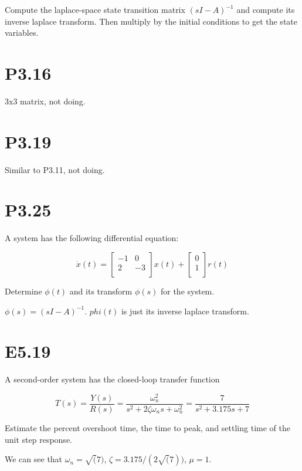 \documentclass[11pt]{article}
\begin{document}
Compute the laplace-space state transition matrix $(sI - A)^{-1}$ and compute its inverse laplace transform. Then multiply by the initial conditions to get the state variables.

\section{P3.16}

3x3 matrix, not doing.

\section{P3.19}

Similar to P3.11, not doing.

\section{P3.25}

A system has the following differential equation:

\[ 
    \dot x(t) =
    \begin{bmatrix}
        -1 & 0 \\
        2 & -3 \\
    \end{bmatrix}
    x(t) + 
    \begin{bmatrix}
        0 \\
        1 \\
    \end{bmatrix}
    r(t)
\]

Determine $\phi(t)$ and its transform $\phi(s)$ for the system.

$\phi(s) = (sI - A)^{-1}$. $phi(t)$ is just its inverse laplace transform.

\section{E5.19}

A second-order system has the closed-loop transfer function

\[
    T(s) = \dfrac{Y(s)}{R(s)} = \dfrac{\omega^2_n}{s^2 + 2 \zeta \omega_n s + \omega^2_n} = \dfrac{7}{s^2 + 3.175s + 7}
\]

Estimate the percent overshoot time, the time to peak, and settling time of the unit step response.

We can see that $\omega_n = \sqrt(7)$, $\zeta = 3.175 / (2 \sqrt(7))$, $\mu = 1$.
\end{document}
